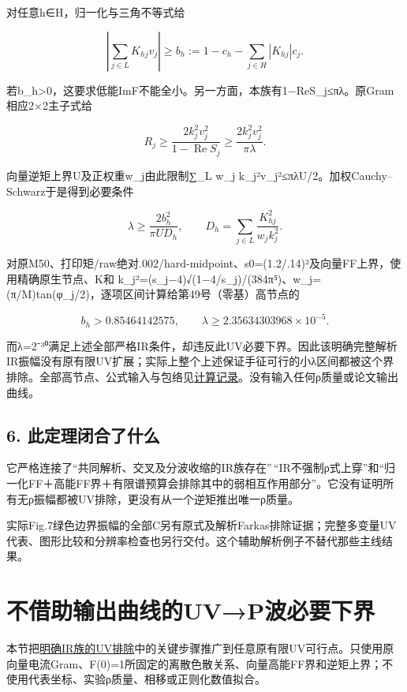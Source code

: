 \documentclass[
  10pt,
  a4paper,
]{article}
\begin{document}
对任意h∈H，归一化与三角不等式给

\[
\left|\sum_{j\in L}K_{hj}v_j\right|\ge
b_h:=1-c_h-\sum_{j\in H}|K_{hj}|c_j.
\]

若b\_h\textgreater0，这要求低能ImF不能全小。另一方面，本族有1−ReS\_j≤πλ。原Gram相应2×2主子式给

\[
R_j\ge\frac{2k_j^2v_j^2}{1-\operatorname{Re}S_j}
\ge\frac{2k_j^2v_j^2}{\pi\lambda}.
\]

向量逆矩上界U及正权重w\_j由此限制∑\_L w\_j
k\_j²v\_j²≤πλU/2。加权Cauchy--Schwarz于是得到必要条件

\[
\lambda\ge\frac{2b_h^2}{\pi U D_h},\qquad
D_h=\sum_{j\in L}\frac{K_{hj}^2}{w_jk_j^2}.
\]

对原M50、打印矩/raw绝对.002/hard-midpoint、s0=(1.2/.14)²及向量FF上界，使用精确原生节点、K和
k\_j²=(s\_j−4)√(1−4/s\_j)/(384π⁵)、w\_j=(π/M)tan(φ\_j/2)，逐项区间计算给第49号（零基）高节点的

\[
b_h>0.85464142575,\qquad
\lambda\ge2.35634303968\times10^{-5}.
\]

而λ=2⁻³⁰满足上述全部严格IR条件，却违反此UV必要下界。因此该明确完整解析IR振幅没有原有限UV扩展；实际上整个上述保证手征可行的小λ区间都被这个界排除。全部高节点、公式输入与包络见\href{../GLOBAL_IR_UV_EXCLUSION.json}{计算记录}。没有输入任何ρ质量或论文输出曲线。

\subsection{6.
此定理闭合了什么}\label{ux6b64ux5b9aux7406ux95edux5408ux4e86ux4ec0ux4e48}

它严格连接了``共同解析、交叉及分波收缩的IR族存在''\,``IR不强制ρ式上穿''和``归一化FF＋高能FF界＋有限谱预算会排除其中的弱相互作用部分''。它没有证明所有无ρ振幅都被UV排除，更没有从一个逆矩推出唯一ρ质量。

实际Fig.7绿色边界振幅的全部C另有原式及解析Farkas排除证据；完整多变量UV代表、图形比较和分辨率检查也另行交付。这个辅助解析例子不替代那些主线结果。

\newpage

\section{不借助输出曲线的UV→P波必要下界}\label{ux4e0dux501fux52a9ux8f93ux51faux66f2ux7ebfux7684uvpux6ce2ux5fc5ux8981ux4e0bux754c}

本节把\href{../../../evidence/GLOBAL_IR_SEED_AND_UV_OBSTRUCTION_20260911.md}{明确IR族的UV排除}中的关键步骤推广到任意原有限UV可行点。只使用原向量电流Gram、F(0)=1所固定的离散色散关系、向量高能FF界和逆矩上界；不使用代表坐标、实验ρ质量、相移或正则化数值拟合。
\end{document}
